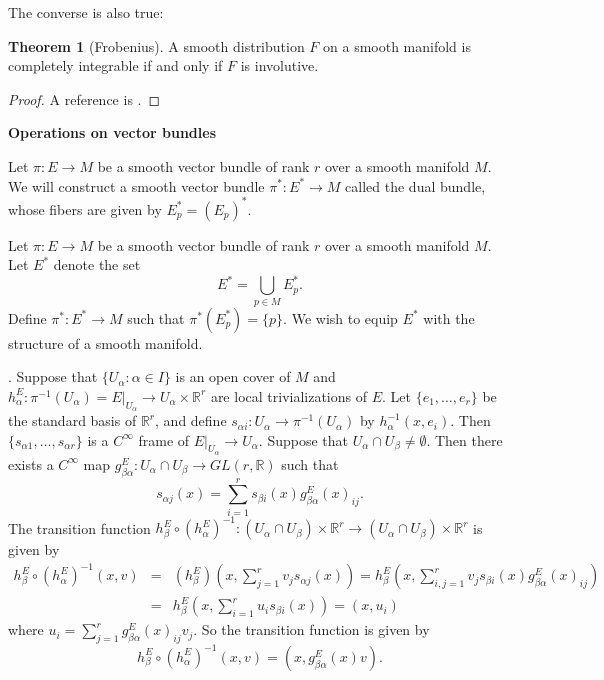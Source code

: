 \documentclass{amsart}
\numberwithin{equation}{section}
\newcommand{\bR}{\mathbb{R}}
\theoremstyle{definition}
\theoremstyle{theorem}
\newtheorem{theorem}[definition]{Theorem}
\begin{document}
The converse is also true:
\begin{theorem}[Frobenius]
A smooth distribution $F$ on a smooth manifold is completely integrable if and only if $F$ is involutive. 
\end{theorem}

\begin{proof}
A reference is \cite[Chapter IV, Section 8]{Bo}. 
\end{proof}


\noindent
{\bf \large Operations on vector bundles}

Let $\pi : E \to M$ be a smooth vector bundle of rank $r$ over a smooth manifold $M$. We will construct a smooth vector bundle $\pi^* : E^* \to M$ called the dual bundle, whose fibers are given by $E^*_p = (E_p)^*$. 


Let $\pi : E \to M$ be a smooth vector bundle of rank $r$ over a smooth manifold $M$. Let $E^*$ denote the set 
\[
E^* = \bigcup_{p \in M}E_p^*.
\]
Define $\pi^*:E^*\to M$ such that $\pi^*(E^*_p)=\{p\}$. 
We wish to equip $E^*$ with the structure of a smooth manifold. 

. Suppose that $\{ U_\alpha:\alpha\in I\}$ is an open cover of $M$ and
$h_\alpha^E :\pi^{-1}(U_\alpha)= E|_{U_\alpha}\to U_\alpha\times \bR^r$ are local trivializations of $E$.
Let $\{e_1,\ldots,e_r\}$ be the standard basis of $\bR^r$, and define
$s_{\alpha i}: U_\alpha\to \pi^{-1}(U_\alpha)$ by $h_\alpha^{-1}(x,e_i)$. Then
$\{ s_{\alpha 1},\ldots, s_{\alpha r}\}$ is a $C^\infty$ frame of $E|_{U_\alpha}\to U_\alpha$. 
Suppose that $U_\alpha\cap U_\beta\neq \emptyset$. Then there exists a $C^\infty$ map
$g_{\beta\alpha}^E:U_\alpha\cap U_\beta\to GL(r,\bR)$ such that 
$$
s_{\alpha j}(x)=\sum_{i=1}^r s_{\beta i}(x) g_{\beta\alpha}^E(x)_{ij}.
$$
The transition function $h^E_\beta\circ (h^E_\alpha)^{-1}: (U_\alpha\cap U_\beta)\times \bR^r \to (U_\alpha\cap U_\beta)\times \bR^r$ is
given by 
\begin{eqnarray*}
h_\beta^E \circ (h_\alpha^E)^{-1}(x,v) &=& (h_\beta^E)(x,\sum_{j=1}^r v_j s_{\alpha j}(x))
=h_\beta^E(x, \sum_{i,j=1}^r v_j s_{\beta i}(x) g_{\beta\alpha}^E(x)_{ij}) \\
&=& h_\beta^E (x, \sum_{i=1}^r u_i s_{\beta i}(x))= (x, u_i)
\end{eqnarray*}
where $u_i =\sum_{j=1}^r g^E_{\beta\alpha}(x)_{ij} v_j$. So the transition function is given by 
$$
h^E_\beta\circ (h_\alpha^E)^{-1}(x,v)= (x,g^E_{\beta\alpha}(x) v).
$$
\end{document}
